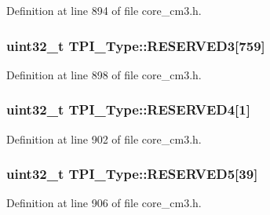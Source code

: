 Definition at line 894 of file core\+\_\+cm3.\+h.

\subsubsection[{\texorpdfstring{R\+E\+S\+E\+R\+V\+E\+D3}{RESERVED3}}]{\setlength{\rightskip}{0pt plus 5cm}uint32\+\_\+t T\+P\+I\+\_\+\+Type\+::\+R\+E\+S\+E\+R\+V\+E\+D3\mbox{[}759\mbox{]}}\hypertarget{structTPI__Type_a31700c8cdd26e4c094db72af33d9f24c}{}\label{structTPI__Type_a31700c8cdd26e4c094db72af33d9f24c}


Definition at line 898 of file core\+\_\+cm3.\+h.

\subsubsection[{\texorpdfstring{R\+E\+S\+E\+R\+V\+E\+D4}{RESERVED4}}]{\setlength{\rightskip}{0pt plus 5cm}uint32\+\_\+t T\+P\+I\+\_\+\+Type\+::\+R\+E\+S\+E\+R\+V\+E\+D4\mbox{[}1\mbox{]}}\hypertarget{structTPI__Type_a684071216fafee4e80be6aaa932cec46}{}\label{structTPI__Type_a684071216fafee4e80be6aaa932cec46}


Definition at line 902 of file core\+\_\+cm3.\+h.

\subsubsection[{\texorpdfstring{R\+E\+S\+E\+R\+V\+E\+D5}{RESERVED5}}]{\setlength{\rightskip}{0pt plus 5cm}uint32\+\_\+t T\+P\+I\+\_\+\+Type\+::\+R\+E\+S\+E\+R\+V\+E\+D5\mbox{[}39\mbox{]}}\hypertarget{structTPI__Type_a3f80dd93f6bab6524603a7aa58de9a30}{}\label{structTPI__Type_a3f80dd93f6bab6524603a7aa58de9a30}


Definition at line 906 of file core\+\_\+cm3.\+h.

